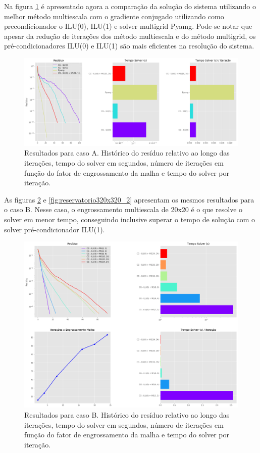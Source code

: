 Na figura \ref{fig:reservatorio100x100_2} é apresentado agora a comparação da solução do sistema utilizando o melhor método multiescala com o gradiente conjugado utilizando como precondicionador o ILU(0), ILU(1) e solver multigrid Pyamg. Pode-se notar que apesar da redução de iterações dos método multiescala e do método multigrid, os pré-condicionadores ILU(0) e ILU(1) são mais eficientes na resolução do sistema. 


\begin{figure}[!htbp]
\label{fig:reservatorio100x100_2}
\centering
\includegraphics[width=\textwidth]{chap08/figs/reservatorio100x100_2.png}
\caption{Resultados para caso A. Histórico do resíduo relativo ao longo das iterações, tempo do solver em segundos, número de iterações em função do fator de engrossamento da malha e tempo do solver por iteração. }
\end{figure}


As figuras \ref{fig:reservatorio320x320_1} e \ref{fig:reservatorio320x320_2} apresentam os mesmos resultados para o caso B. Nesse caso, o engrossamento multiescala de 20x20 é o que resolve o solver em menor tempo, conseguindo inclusive superar o tempo de solução com o solver pré-condicionador ILU(1).


\begin{figure}[!htbp]
\label{fig:reservatorio320x320_1}
\centering
\includegraphics[width=\textwidth]{chap08/figs/reservatorio320x320_1.png}
\caption{Resultados para caso B. Histórico do resíduo relativo ao longo das iterações, tempo do solver em segundos, número de iterações em função do fator de engrossamento da malha e tempo do solver por iteração. }
\end{figure}


